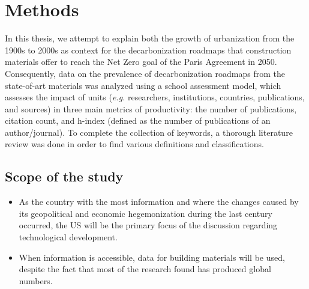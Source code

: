 \section{Methods}
In this thesis, we attempt to explain both the growth of urbanization from the 1900s to 2000s as context for the decarbonization roadmaps that construction materials offer to reach the Net Zero goal of the Paris Agreement in 2050. Consequently, data on the prevalence of decarbonization roadmaps from the state-of-art materials was analyzed using a school assessment model, which assesses the impact of units  (\textit{e.g.} researchers, institutions, countries, publications, and sources) in three main metrics of productivity: the number of publications, citation count, and h-index (defined as the number of publications of an author/journal). To complete the collection of keywords, a thorough literature review was done in order to find various definitions and classifications.

\subsection{Scope of the study}

\begin{itemize}
\item As the country with the most information and where the changes caused by its geopolitical and economic hegemonization during the last century occurred, the US will be the primary focus of the discussion regarding technological development.
\item When information is accessible, data for building materials will be used, despite the fact that most of the research found has produced global numbers.
\end{itemize}


